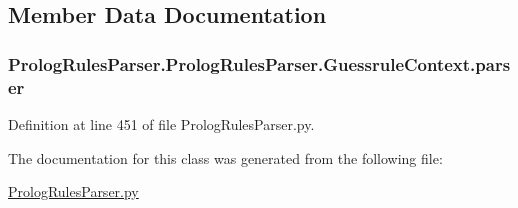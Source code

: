 \subsection{Member Data Documentation}
\hypertarget{class_prolog_rules_parser_1_1_prolog_rules_parser_1_1_guessrule_context_abc024afc97dd2b002b79c0f2b5aaa641}{}
\subsubsection[{parser}]{\setlength{\rightskip}{0pt plus 5cm}Prolog\+Rules\+Parser.\+Prolog\+Rules\+Parser.\+Guessrule\+Context.\+parser}\label{class_prolog_rules_parser_1_1_prolog_rules_parser_1_1_guessrule_context_abc024afc97dd2b002b79c0f2b5aaa641}


Definition at line 451 of file Prolog\+Rules\+Parser.\+py.



The documentation for this class was generated from the following file\+:\begin{DoxyCompactItemize}
\item 
\hyperlink{_prolog_rules_parser_8py}{Prolog\+Rules\+Parser.\+py}\end{DoxyCompactItemize}
